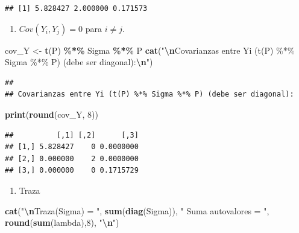 \documentclass[
]{book}
\newenvironment{Shaded}{\begin{snugshade}}{\end{snugshade}}
\newcommand{\DecValTok}[1]{\textcolor[rgb]{0.00,0.00,0.81}{#1}}
\newcommand{\FunctionTok}[1]{\textcolor[rgb]{0.13,0.29,0.53}{\textbf{#1}}}
\newcommand{\NormalTok}[1]{#1}
\newcommand{\OtherTok}[1]{\textcolor[rgb]{0.56,0.35,0.01}{#1}}
\newcommand{\SpecialCharTok}[1]{\textcolor[rgb]{0.81,0.36,0.00}{\textbf{#1}}}
\newcommand{\StringTok}[1]{\textcolor[rgb]{0.31,0.60,0.02}{#1}}
\providecommand{\tightlist}{%
  \setlength{\itemsep}{0pt}\setlength{\parskip}{0pt}}
\begin{document}
\begin{verbatim}
## [1] 5.828427 2.000000 0.171573
\end{verbatim}

\begin{enumerate}
\def\labelenumi{\arabic{enumi})}
\setcounter{enumi}{1}
\tightlist
\item
  \(Cov(Y_i, Y_j)=0\) para \(i\neq j\).
\end{enumerate}

\begin{Shaded}
\begin{Highlighting}[]
\NormalTok{cov\_Y }\OtherTok{\textless{}{-}} \FunctionTok{t}\NormalTok{(P) }\SpecialCharTok{\%*\%}\NormalTok{ Sigma }\SpecialCharTok{\%*\%}\NormalTok{ P}
\FunctionTok{cat}\NormalTok{(}\StringTok{"}\SpecialCharTok{\textbackslash{}n}\StringTok{Covarianzas entre Yi (t(P) \%*\% Sigma \%*\% P) (debe ser diagonal):}\SpecialCharTok{\textbackslash{}n}\StringTok{"}\NormalTok{)}
\end{Highlighting}
\end{Shaded}

\begin{verbatim}
## 
## Covarianzas entre Yi (t(P) %*% Sigma %*% P) (debe ser diagonal):
\end{verbatim}

\begin{Shaded}
\begin{Highlighting}[]
\FunctionTok{print}\NormalTok{(}\FunctionTok{round}\NormalTok{(cov\_Y, }\DecValTok{8}\NormalTok{))}
\end{Highlighting}
\end{Shaded}

\begin{verbatim}
##          [,1] [,2]      [,3]
## [1,] 5.828427    0 0.0000000
## [2,] 0.000000    2 0.0000000
## [3,] 0.000000    0 0.1715729
\end{verbatim}

\begin{enumerate}
\def\labelenumi{\arabic{enumi})}
\setcounter{enumi}{2}
\tightlist
\item
  Traza
\end{enumerate}

\begin{Shaded}
\begin{Highlighting}[]
\FunctionTok{cat}\NormalTok{(}\StringTok{"}\SpecialCharTok{\textbackslash{}n}\StringTok{Traza(Sigma) = "}\NormalTok{, }\FunctionTok{sum}\NormalTok{(}\FunctionTok{diag}\NormalTok{(Sigma)), }\StringTok{"  Suma autovalores = "}\NormalTok{, }\FunctionTok{round}\NormalTok{(}\FunctionTok{sum}\NormalTok{(lambda),}\DecValTok{8}\NormalTok{), }\StringTok{"}\SpecialCharTok{\textbackslash{}n}\StringTok{"}\NormalTok{)}
\end{Highlighting}
\end{Shaded}
\end{document}
